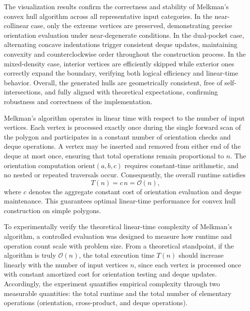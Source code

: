 \documentclass{article}
\begin{document}
The visualization results confirm the correctness and stability of Melkman’s convex hull algorithm across all representative input categories.  
In the near-collinear case, only the extreme vertices are preserved, demonstrating precise orientation evaluation under near-degenerate conditions.  
In the dual-pocket case, alternating concave indentations trigger consistent deque updates, maintaining convexity and counterclockwise order throughout the construction process.  
In the mixed-density case, interior vertices are efficiently skipped while exterior ones correctly expand the boundary, verifying both logical efficiency and linear-time behavior.  
Overall, the generated hulls are geometrically consistent, free of self-intersections, and fully aligned with theoretical expectations, confirming robustness and correctness of the implementation.



Melkman’s algorithm operates in linear time with respect to the number of input vertices.  
Each vertex is processed exactly once during the single forward scan of the polygon and participates in a constant number of orientation checks and deque operations.  
A vertex may be inserted and removed from either end of the deque at most once, ensuring that total operations remain proportional to \(n\).  
The orientation computation \(\text{orient}(a,b,c)\) requires constant-time arithmetic, and no nested or repeated traversals occur.  
Consequently, the overall runtime satisfies
\[
T(n)=c\,n=\mathcal{O}(n),
\]
where \(c\) denotes the aggregate constant cost of orientation evaluation and deque maintenance.  
This guarantees optimal linear-time performance for convex hull construction on simple polygons.


To experimentally verify the theoretical linear-time complexity of Melkman’s algorithm, a controlled evaluation was designed to measure how runtime and operation count scale with problem size.  
From a theoretical standpoint, if the algorithm is truly \(\mathcal{O}(n)\), the total execution time \(T(n)\) should increase linearly with the number of input vertices \(n\), since each vertex is processed once with constant amortized cost for orientation testing and deque updates.  
Accordingly, the experiment quantifies empirical complexity through two measurable quantities: the total runtime and the total number of elementary operations (orientation, cross-product, and deque operations).
\end{document}
